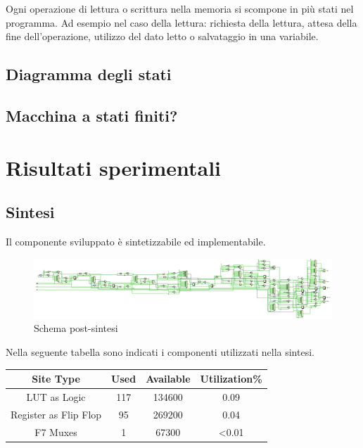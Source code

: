 \documentclass{article}
\begin{document}
Ogni operazione di lettura o scrittura nella memoria si scompone in più stati nel programma.
Ad esempio nel caso della lettura: richiesta della lettura, attesa della fine dell'operazione, utilizzo del dato letto o salvataggio in una variabile. 

\subsection{Diagramma degli stati}

\subsection{Macchina a stati finiti?}




\section{Risultati sperimentali}
\subsection{Sintesi}
Il componente sviluppato è sintetizzabile ed implementabile. 
\begin{figure}[H]
	\centering
	\includegraphics[width=1\textwidth]{Assets/schematic.eps}
	\caption{Schema post-sintesi}
\end{figure}
Nella seguente tabella sono indicati i componenti utilizzati nella sintesi.
\begin{center}
	\begin{tabular}{|c|c|c|c|}
		\hline
		Site Type   & Used & Available & Utilization\% \\
		\hline
		LUT as Logic & 117 & 134600 & 0.09 \\
		\hline
		Register as Flip Flop & 95 & 269200  & 0.04\\
		\hline
		F7 Muxes & 1 & 67300 & <0.01\\
		\hline
	\end{tabular}
\end{center}
\end{document}
